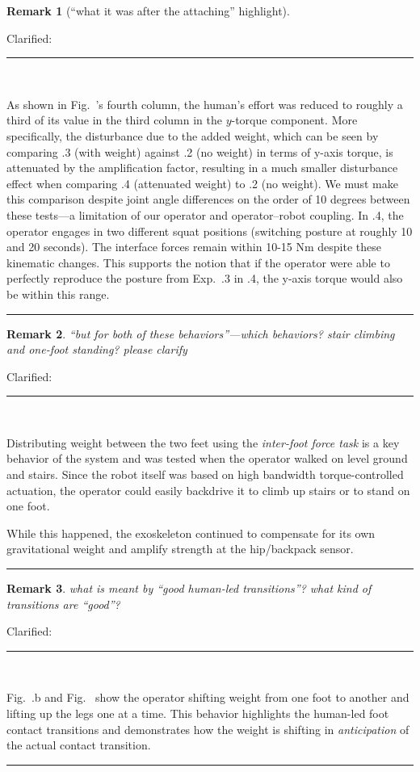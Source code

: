 \documentclass[10pt,letterpaper]{letter}
\renewcommand*{\ref}[1]{\zref{#1}}
\newcommand*{\ta}[1]{\textcolor[HTML]{107f10}{#1}}
\newcommand*{\ra}[1]{}
\newcounter{reviewer}
\newtheorem{rev}{Remark}[reviewer]
\newcommand{\reviewer}[1]{\begin{rev} #1\end{rev}}
\newcommand{\response}[1]{\par{\hfill\begin{minipage}{\dimexpr\textwidth-2cm} #1\end{minipage}}}
\newcommand{\paperquote}[1]{%
	\begin{center}
		
		\begin{minipage}{.8\textwidth}
			{\rule{\textwidth}{.5pt}}\vspace{.5em}\\
			\begin{minipage}{\textwidth}\setlength{\parindent}{2em}#1\end{minipage}
			\vspace{.5em}
			{\rule{\textwidth}{.5pt}}
		\end{minipage}%
	\end{center}
}
\begin{document}
\begin{letter}{}

\reviewer{[``what it was after the attaching'' highlight]}
\response{Clarified:}
\paperquote{
As shown in Fig.~\ref{fig:experiment}'s fourth column, the human's effort was reduced to roughly a third of its value in the third column in the $y$-torque component.
\ta{More specifically, the disturbance due to the added weight, which can be seen by comparing \ref{subs:amp}.3 (with weight) against \ref{subs:amp}.2 (no weight) in terms of y-axis torque, is attenuated by the amplification factor, resulting in a much smaller disturbance effect when comparing \ref{subs:amp}.4 (attenuated weight) to \ref{subs:amp}.2 (no weight). We must make this comparison despite joint angle differences on the order of 10 degrees between these tests---a limitation of our operator and operator--robot coupling. In \ref{subs:amp}.4, the operator engages in two different squat positions (switching posture at roughly 10 and 20 seconds). The interface forces remain within 10-15 Nm despite these kinematic changes. This supports the notion that if the operator were able to perfectly reproduce the posture from Exp.~\ref{subs:amp}.3 in \ref{subs:amp}.4, the y-axis torque would also be within this range.}
}

\reviewer{``but for both of these behaviors''---which behaviors? stair climbing and one-foot standing? please clarify}
\response{Clarified:}
\paperquote{
\ra{With or without amplification, the primary behavior of the system was to use shared-body control to partially compensate the robot's own gravity while allowing human-led foot transitions through the \ta{\emph{inter-foot force task}}.}\ta{Distributing weight between the two feet using the \ta{\emph{inter-foot force task}} is a key behavior of the system and was tested when the operator walked on level ground and stairs.}
Since the robot itself was based on high bandwidth torque-controlled actuation, the operator could easily backdrive it to climb up stairs or to stand on one foot.%
\ra{Since this was the case\ta{,} gravity compensation was the dominant effect of the controller, with amplification acting in a supplemental role.
	But \ta{with or without amplification}, the control of the contact transitions via the \ta{\emph{inter-foot force task}} was key.}
\ta{While this happened, the exoskeleton continued to compensate for its own gravitational weight and amplify strength at the hip/backpack sensor.}
}

\reviewer{what is meant by ``good human-led transitions''? what kind of transitions are ``good''?}
\response{Clarified:}
\paperquote{
\ta{Fig.~\ref{fig:demo}.b and Fig.~\ref{fig:transitions} show the operator shifting weight from one foot to another and lifting up the legs one at a time.}
\ta{This behavior highlights the human-led foot contact transitions and demonstrates how the weight is shifting in \emph{anticipation} of the actual contact transition.}
}


\end{letter}
\end{document}

